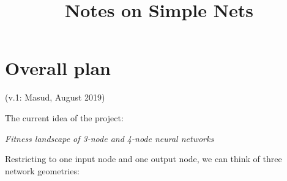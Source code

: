 \documentclass[12pt,a4paper]{article}
\begin{document}
\title{ Notes on Simple Nets }

\author[$\dagger$]{}
\date{}

\maketitle


\section{Overall plan}

(v.1: Masud, August 2019)

The current idea of the project:

\begin{center}\emph{Fitness landscape of 3-node and 4-node neural networks}
\end{center}

Restricting to one input node and one output node, we can think of three network geometries:
\end{document}
